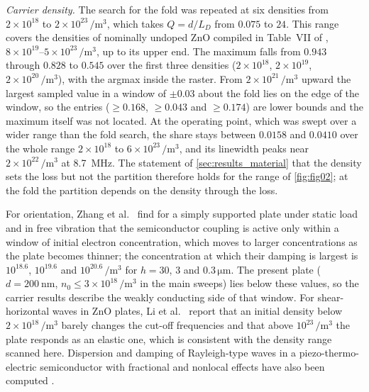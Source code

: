 \emph{Carrier density.}  The search for the fold was repeated at six densities from
$2\times10^{18}$ to $2\times10^{23}\,\si{\per\cubic\metre}$, which takes $Q=d/L_D$ from $0.075$ to $24$.  This range covers the densities of nominally undoped ZnO compiled in Table~VII of \cite{ozgur2005zno}, $8\times10^{19}$--$5\times10^{23}\,\si{\per\cubic\metre}$, up to its upper end.  The
maximum falls from $0.943$ through $0.828$ to $0.545$ over the first three densities ($2\times10^{18}$, $2\times10^{19}$, $2\times10^{20}\,\si{\per\cubic\metre}$), with the argmax inside the raster.  From
$2\times10^{21}\,\si{\per\cubic\metre}$ upward the largest sampled value in a window of $\pm0.03$ about the
fold lies on the edge of the window, so the entries ($\ge0.168$, $\ge0.043$ and $\ge0.174$) are lower bounds and the maximum itself was not located.  At the operating
point, which was swept over a wider range than the fold search, the share stays between $0.0158$ and $0.0410$ over the whole range $2\times10^{18}$ to
$6\times10^{23}\,\si{\per\cubic\metre}$, and its linewidth peaks near $2\times10^{22}\,\si{\per\cubic\metre}$ at
\SI{8.7}{\mega\hertz}.  The statement of \cref{sec:results_material} that the density sets the loss but not the
partition therefore holds for the range of \cref{fig:fig02}; at the fold the partition depends on the density through the loss.


For orientation, Zhang et al.\ \cite{zhang2025pscplate} find for a simply supported plate under static load and in free vibration that the semiconductor coupling is active only within a window of initial electron concentration, which moves to larger concentrations as the plate becomes thinner; the concentration at which their damping is largest is $10^{18.6}$, $10^{19.6}$ and $10^{20.6}\,\si{\per\cubic\metre}$ for $h=30$, $3$ and $0.3\,\si{\micro\metre}$.  The present plate ($d=\SI{200}{\nano\metre}$, $n_0\le3\times10^{18}\,\si{\per\cubic\metre}$ in the main sweeps) lies below these values, so the carrier results describe the weakly conducting side of that window.  For shear-horizontal waves in ZnO plates, Li et al.\ \cite{li2023sh} report that an initial density below $2\times10^{18}\,\si{\per\cubic\metre}$ barely changes the cut-off frequencies and that above $10^{23}\,\si{\per\cubic\metre}$ the plate responds as an elastic one, which is consistent with the density range scanned here.  Dispersion and damping of Rayleigh-type waves in a piezo-thermo-electric semiconductor with fractional and nonlocal effects have also been computed \cite{aldandani2026kg}.


